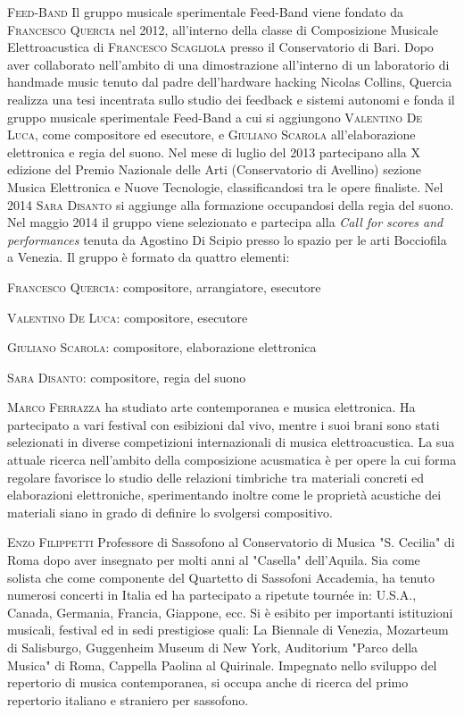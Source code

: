\documentclass[9pt, twoside, a5paper]{extreport}
\newcommand{\biografia}[2]{%
\noindent \textsc{#1} %
#2 %
\medskip
}%
\begin{document}
\begin{multicols}{2}
\biografia{Feed-Band}{Il gruppo musicale sperimentale Feed-Band viene fondato da \textsc{Francesco Quercia} nel 2012, all'interno della classe di Composizione Musicale Elettroacustica di \textsc{Francesco Scagliola} presso il Conservatorio di Bari. Dopo aver collaborato nell'ambito di una dimostrazione all'interno di un laboratorio di handmade music tenuto dal padre dell'hardware hacking Nicolas Collins, Quercia realizza una tesi incentrata sullo studio dei feedback e sistemi autonomi e fonda il gruppo musicale sperimentale Feed-Band a cui si aggiungono \textsc{Valentino De Luca}, come compositore ed esecutore, e \textsc{Giuliano Scarola} all'elaborazione elettronica e regia del suono. Nel mese di luglio del 2013 partecipano alla X edizione del Premio Nazionale delle Arti (Conservatorio di Avellino) sezione Musica Elettronica e Nuove Tecnologie, classificandosi tra le opere finaliste. Nel 2014 \textsc{Sara Disanto} si aggiunge alla formazione occupandosi della regia del suono. Nel maggio 2014 il gruppo viene selezionato e partecipa alla \textit{Call for scores and performances} tenuta da Agostino Di Scipio presso lo spazio per le arti Bocciofila a Venezia.				
Il gruppo è formato da quattro elementi:

\textsc{Francesco Quercia}: compositore, arrangiatore, esecutore

\textsc{Valentino De Luca}: compositore, esecutore

\textsc{Giuliano Scarola}: compositore, elaborazione elettronica

\textsc{Sara Disanto}: compositore, regia del suono}

\biografia{Marco Ferrazza}{ha studiato arte contemporanea e musica elettronica. Ha partecipato a vari festival con esibizioni dal vivo, mentre i suoi brani sono stati selezionati in diverse competizioni internazionali di musica elettroacustica. 
La sua attuale ricerca nell'ambito della composizione acusmatica è per opere la cui forma regolare favorisce lo studio delle relazioni timbriche tra materiali concreti ed elaborazioni elettroniche, sperimentando inoltre come le proprietà acustiche dei materiali siano in grado di definire lo svolgersi compositivo.}

\biografia{Enzo Filippetti}{Professore di Sassofono al Conservatorio di Musica "S. Cecilia" di Roma dopo aver insegnato per molti anni al "Casella" dell’Aquila. Sia come solista che come componente del Quartetto di Sassofoni Accademia, ha tenuto numerosi concerti in Italia ed ha partecipato a ripetute tournée in: U.S.A., Canada, Germania, Francia, Giappone, ecc. Si è esibito per importanti istituzioni musicali, festival ed in sedi prestigiose quali: La Biennale di Venezia, Mozarteum di Salisburgo, Guggenheim Museum di New York, Auditorium "Parco della Musica" di Roma, Cappella Paolina al Quirinale. Impegnato nello sviluppo del repertorio di musica contemporanea, si occupa anche di ricerca del primo repertorio italiano e straniero per sassofono.}


\end{multicols}
\end{document}
